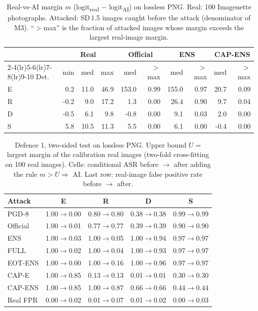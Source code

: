 \begin{table}[!t]
\caption{Real-vs-AI margin $m$ (logit\textsubscript{real} $-$ logit\textsubscript{AI}) on lossless PNG. Real: 100 Imagenette photographs. Attacked: SD\,1.5 images caught before the attack (denominator of M3). ``$>$max'' is the fraction of attacked images whose margin exceeds the largest real-image margin.}
\label{tab:margins}
\centering\footnotesize\setlength{\tabcolsep}{3.5pt}
\begin{tabular}{l rrr rr rr rr}
\toprule
 & \multicolumn{3}{c}{Real} & \multicolumn{2}{c}{Official} & \multicolumn{2}{c}{ENS} & \multicolumn{2}{c}{CAP-ENS} \\
\cmidrule(lr){2-4}\cmidrule(lr){5-6}\cmidrule(lr){7-8}\cmidrule(lr){9-10}
Det. & min & med & max & med & $>$max & med & $>$max & med & $>$max \\
\midrule
E & 0.2 & 11.0 & 46.9 & 153.0 & 0.99 & 155.0 & 0.97 & 20.7 & 0.09 \\
R & -0.2 & 9.0 & 17.2 & 1.3 & 0.00 & 26.4 & 0.90 & 9.7 & 0.04 \\
D & -0.5 & 6.1 & 9.8 & -0.8 & 0.00 & 9.1 & 0.03 & 2.0 & 0.00 \\
S & 5.8 & 10.5 & 11.3 & 5.5 & 0.00 & 6.1 & 0.00 & -0.4 & 0.00 \\
\bottomrule
\end{tabular}
\end{table}

\begin{table}[!t]
\caption{Defence 1, two-sided test on lossless PNG. Upper bound $U$ = largest margin of the calibration real images (two-fold cross-fitting on 100 real images). Cells: conditional ASR before $\rightarrow$ after adding the rule $m > U \Rightarrow$ AI. Last row: real-image false positive rate before $\rightarrow$ after.}
\label{tab:twosided}
\centering\footnotesize
\begin{tabular}{l cccc}
\toprule
Attack & E & R & D & S \\
\midrule
PGD-8 & 1.00$\rightarrow$0.00 & 0.80$\rightarrow$0.80 & 0.38$\rightarrow$0.38 & 0.99$\rightarrow$0.99 \\
Official & 1.00$\rightarrow$0.01 & 0.77$\rightarrow$0.77 & 0.39$\rightarrow$0.39 & 0.90$\rightarrow$0.90 \\
ENS & 1.00$\rightarrow$0.03 & 1.00$\rightarrow$0.05 & 1.00$\rightarrow$0.94 & 0.97$\rightarrow$0.97 \\
FULL & 1.00$\rightarrow$0.02 & 1.00$\rightarrow$0.04 & 1.00$\rightarrow$0.93 & 0.97$\rightarrow$0.97 \\
EOT-ENS & 1.00$\rightarrow$0.00 & 1.00$\rightarrow$0.16 & 1.00$\rightarrow$0.96 & 0.97$\rightarrow$0.97 \\
CAP-E & 1.00$\rightarrow$0.85 & 0.13$\rightarrow$0.13 & 0.01$\rightarrow$0.01 & 0.30$\rightarrow$0.30 \\
CAP-ENS & 1.00$\rightarrow$0.85 & 1.00$\rightarrow$0.87 & 0.66$\rightarrow$0.66 & 0.44$\rightarrow$0.44 \\
\midrule
Real FPR & 0.00$\rightarrow$0.02 & 0.01$\rightarrow$0.07 & 0.01$\rightarrow$0.02 & 0.00$\rightarrow$0.03 \\
\bottomrule
\end{tabular}
\end{table}

